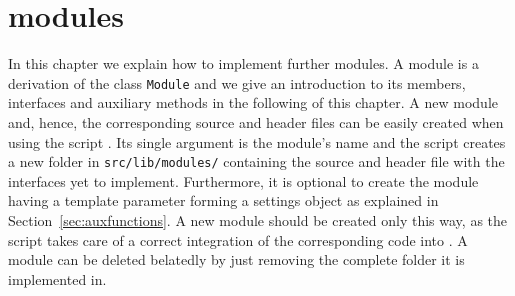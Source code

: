 \chapter{\smtrat modules}
\label{chapter:implementingamodule}
In this chapter we explain how to implement further modules. A module is a derivation
of the class \texttt{Module} and we give an 
introduction to its members, interfaces and auxiliary methods in the following of this
chapter. A new module and, hence, the corresponding \Cpp source and header files can be easily
created when using the script \writeModule. Its single argument is the module's name
and the script creates a new folder in \texttt{src/lib/modules/} containing the
source and header file with the interfaces yet to implement. Furthermore, it is optional to create the
module having a template parameter forming a settings object as explained in Section~\ref{sec:auxfunctions}.
A new module should be created only this way, as the script takes care of a correct integration of the corresponding code
into \smtrat. A module can be deleted belatedly by just removing the complete folder it is implemented in.

